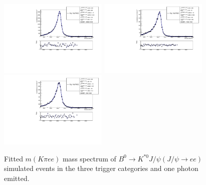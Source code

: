 \begin{figure}[h!]
\centering
\includegraphics[width=0.46\textwidth]{RKst/figs/fit_EEs_0_EE-q2central-gmc/KstJPsEE_1g_L0E_fitAndRes.pdf}
\includegraphics[width=0.46\textwidth]{RKst/figs/fit_EEs_0_EE-q2central-gmc/KstJPsEE_1g_L0H_fitAndRes.pdf}
\includegraphics[width=0.46\textwidth]{RKst/figs/fit_EEs_0_EE-q2central-gmc/KstJPsEE_1g_L0I_fitAndRes.pdf}
\caption{Fitted $m(K\pi ee)$ mass spectrum of $B^0 \rightarrow K^{*0} J/\psi(J/\psi\rightarrow ee)$ simulated
events in the three trigger categories and one photon emitted. }
\label{fig:FitEE_MC_inTrigCat_Brem1}
\end{figure}
%
